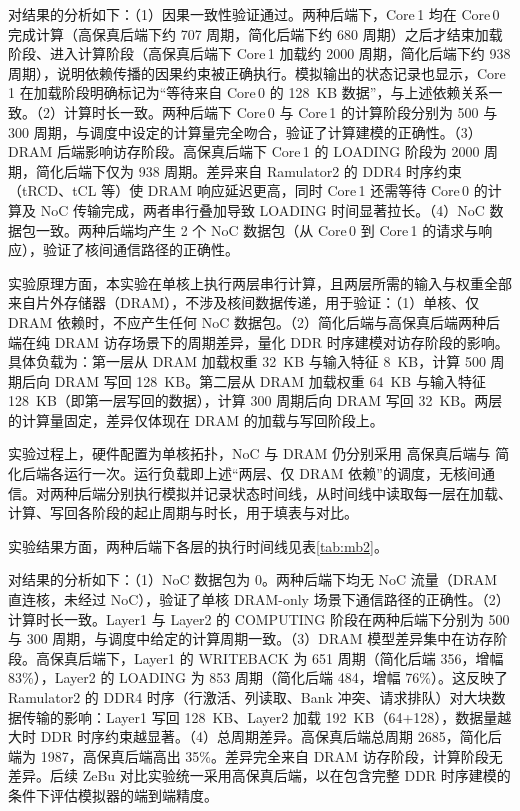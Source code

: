 对结果的分析如下：（1）因果一致性验证通过。两种后端下，Core\,1 均在 Core\,0 完成计算（高保真后端下约 707 周期，简化后端下约 680 周期）之后才结束加载阶段、进入计算阶段（高保真后端下 Core\,1 加载约 2000 周期，简化后端下约 938 周期），说明依赖传播的因果约束被正确执行。模拟输出的状态记录也显示，Core\,1 在加载阶段明确标记为“等待来自 Core\,0 的 \SI{128}{KB} 数据”，与上述依赖关系一致。（2）计算时长一致。两种后端下 Core\,0 与 Core\,1 的计算阶段分别为 500 与 300 周期，与调度中设定的计算量完全吻合，验证了计算建模的正确性。（3）DRAM 后端影响访存阶段。高保真后端下 Core\,1 的 LOADING 阶段为 2000 周期，简化后端下仅为 938 周期。差异来自 Ramulator2 的 DDR4 时序约束（tRCD、tCL 等）使 DRAM 响应延迟更高，同时 Core\,1 还需等待 Core\,0 的计算及 NoC 传输完成，两者串行叠加导致 LOADING 时间显著拉长。（4）NoC 数据包一致。两种后端均产生 2 个 NoC 数据包（从 Core\,0 到 Core\,1 的请求与响应），验证了核间通信路径的正确性。


实验原理方面，本实验在单核上执行两层串行计算，且两层所需的输入与权重全部来自片外存储器（DRAM），不涉及核间数据传递，用于验证：（1）单核、仅 DRAM 依赖时，不应产生任何 NoC 数据包。（2）简化后端与高保真后端两种后端在纯 DRAM 访存场景下的周期差异，量化 DDR 时序建模对访存阶段的影响。具体负载为：第一层从 DRAM 加载权重 \SI{32}{KB} 与输入特征 \SI{8}{KB}，计算 500 周期后向 DRAM 写回 \SI{128}{KB}。第二层从 DRAM 加载权重 \SI{64}{KB} 与输入特征 \SI{128}{KB}（即第一层写回的数据），计算 300 周期后向 DRAM 写回 \SI{32}{KB}。两层的计算量固定，差异仅体现在 DRAM 的加载与写回阶段上。

实验过程上，硬件配置为单核拓扑，NoC 与 DRAM 仍分别采用 高保真后端与 简化后端各运行一次。运行负载即上述“两层、仅 DRAM 依赖”的调度，无核间通信。对两种后端分别执行模拟并记录状态时间线，从时间线中读取每一层在加载、计算、写回各阶段的起止周期与时长，用于填表与对比。

实验结果方面，两种后端下各层的执行时间线见表\ref{tab:mb2}。

对结果的分析如下：（1）NoC 数据包为 0。两种后端下均无 NoC 流量（DRAM 直连核，未经过 NoC），验证了单核 DRAM-only 场景下通信路径的正确性。（2）计算时长一致。Layer1 与 Layer2 的 COMPUTING 阶段在两种后端下分别为 500 与 300 周期，与调度中给定的计算周期一致。（3）DRAM 模型差异集中在访存阶段。高保真后端下，Layer1 的 WRITEBACK 为 651 周期（简化后端 356，增幅 83\%），Layer2 的 LOADING 为 853 周期（简化后端 484，增幅 76\%）。这反映了 Ramulator2 的 DDR4 时序（行激活、列读取、Bank 冲突、请求排队）对大块数据传输的影响：Layer1 写回 \SI{128}{KB}、Layer2 加载 \SI{192}{KB}（64+128），数据量越大时 DDR 时序约束越显著。（4）总周期差异。高保真后端总周期 2685，简化后端为 1987，高保真后端高出 35\%。差异完全来自 DRAM 访存阶段，计算阶段无差异。后续 ZeBu 对比实验统一采用高保真后端，以在包含完整 DDR 时序建模的条件下评估模拟器的端到端精度。

